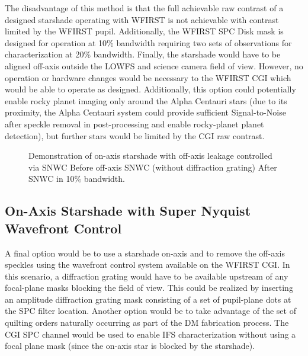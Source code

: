 \documentclass[]{spie}  %
\begin{document}
The disadvantage of this method is that the full achievable raw contrast of a designed starshade operating with WFIRST is not achievable with contrast limited by the WFIRST pupil. Additionally, the WFIRST SPC Disk mask is designed for operation at 10\% bandwidth requiring two sets of observations for characterization at 20\% bandwidth. Finally, the starshade would have to be aligned off-axis outside the LOWFS and science camera field of view. However, no operation or hardware changes would be necessary to the WFIRST CGI which would be able to operate as designed. Additionally, this option could potentially enable rocky planet imaging only around the Alpha Centauri stars (due to its proximity, the Alpha Centauri system could provide sufficient Signal-to-Noise after speckle removal in post-processing and enable rocky-planet planet detection), but further stars would be limited by the CGI raw contrast.

\begin{figure}[t!]
\centering
{}
\caption[Companion Leakage]
{\label{fig:starshadeSNWC} Demonstration of on-axis starshade with off-axis leakage controlled via SNWC  Before off-axis SNWC (without diffraction grating)  After SNWC in 10\% bandwidth.}
\end{figure}

\subsection{On-Axis Starshade with Super Nyquist Wavefront Control}

A final option would be to use a starshade on-axis and to remove the off-axis speckles using the wavefront control system available on the WFIRST CGI. In this scenario, a diffraction grating would have to be available upstream of any focal-plane masks blocking the field of view. This could be realized by inserting an amplitude diffraction grating mask consisting of a set of pupil-plane dots at the SPC filter location. Another option would be to take advantage of the set of quilting orders naturally occurring as part of the DM fabrication process. The CGI SPC channel would be used to enable IFS characterization without using a focal plane mask (since the on-axis star is blocked by the starshade).
\end{document}
